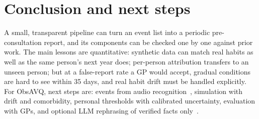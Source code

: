 \documentclass[10pt,a4paper]{article}
\begin{document}
\section{Conclusion and next steps}
A small, transparent pipeline can turn an event list into a periodic pre-consultation report, and its components can
be checked one by one against prior work. The main lessons are quantitative: synthetic data can match real habits as
well as the same person's next year does; per-person attribution transfers to an unseen person; but at a false-report
rate a GP would accept, gradual conditions are hard to see within 35 days, and real habit drift must be handled
explicitly. For ObsAVQ, next steps are: events from audio recognition~\cite{vacher2011audio}, simulation with drift and
comorbidity, personal thresholds with calibrated uncertainty, evaluation with GPs, and optional LLM rephrasing of
verified facts only~\cite{fiori2025llm}.



\end{document}
